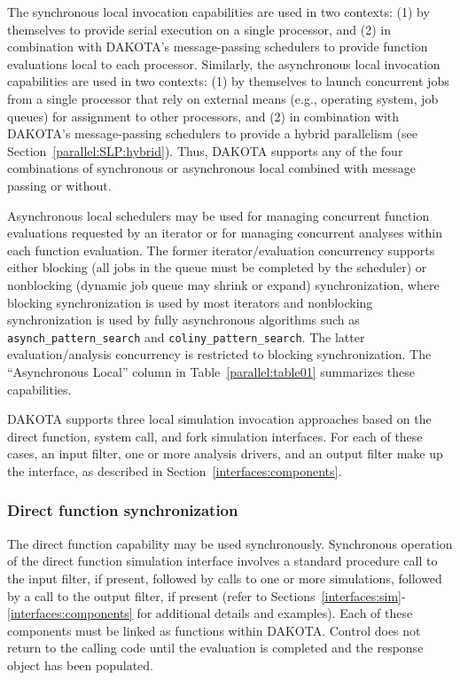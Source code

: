 The synchronous local invocation capabilities are used in two
contexts: (1) by themselves to provide serial execution on a single
processor, and (2) in combination with DAKOTA's message-passing
schedulers to provide function evaluations local to each
processor. Similarly, the asynchronous local invocation capabilities
are used in two contexts: (1) by themselves to launch concurrent jobs
from a single processor that rely on external means (e.g., operating
system, job queues) for assignment to other processors, and (2) in
combination with DAKOTA's message-passing schedulers to provide a
hybrid parallelism (see Section~\ref{parallel:SLP:hybrid}).  Thus,
DAKOTA supports any of the four combinations of synchronous or
asynchronous local combined with message passing or without.

Asynchronous local schedulers may be used for managing concurrent
function evaluations requested by an iterator or for managing
concurrent analyses within each function evaluation.  The former
iterator/evaluation concurrency supports either blocking (all jobs in
the queue must be completed by the scheduler) or nonblocking (dynamic
job queue may shrink or expand) synchronization, where blocking
synchronization is used by most iterators and nonblocking
synchronization is used by fully asynchronous algorithms such as
\texttt{asynch\_pattern\_search} and \texttt{coliny\_pattern\_search}.  The
latter evaluation/analysis concurrency is restricted to blocking
synchronization.  The ``Asynchronous Local'' column in
Table~\ref{parallel:table01} summarizes these capabilities.

DAKOTA supports three local simulation invocation approaches based on
the direct function, system call, and fork simulation interfaces.  For
each of these cases, an input filter, one or more analysis drivers,
and an output filter make up the interface, as described in
Section~\ref{interfaces:components}.

\subsubsection{Direct function synchronization}\label{parallel:SLP:local:direct}

The direct function capability may be used synchronously. Synchronous
operation of the direct function simulation interface involves a
standard procedure call to the input filter, if present, followed by
calls to one or more simulations, followed by a call to the output
filter, if present (refer to
Sections~\ref{interfaces:sim}-\ref{interfaces:components} for
additional details and examples). Each of these components must be
linked as functions within DAKOTA. Control does not return to the
calling code until the evaluation is completed and the response object
has been populated.

